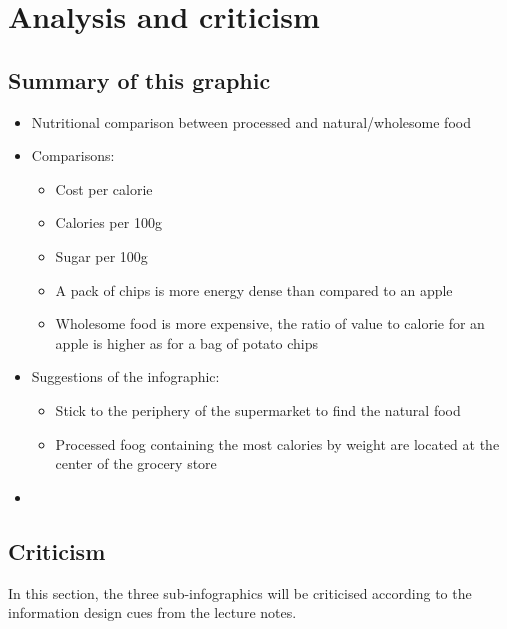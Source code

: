\documentclass{article}
\begin{document}
\section{Analysis and criticism}
\subsection{Summary of this graphic}

    \begin{itemize}
       \item Nutritional comparison between processed and natural/wholesome food
       \item Comparisons:
       \begin{itemize}
         \item Cost per calorie
         \item Calories per 100g
         \item Sugar per 100g
         \item A pack of chips is more energy dense than compared to an apple
         \item Wholesome food is more expensive, the ratio of value to calorie for an apple is higher as for a bag of potato chips
       \end{itemize}
       \item Suggestions of the infographic:
       \begin{itemize}
           \item Stick to the periphery of the supermarket to find the natural food
           \item Processed foog containing the most calories by weight are located at the center of the grocery store
       \end{itemize}
       \item 
    \end{itemize}

\subsection{Criticism}
In this section, the three sub-infographics will be criticised according to the information design cues from the lecture notes.
\end{document}
